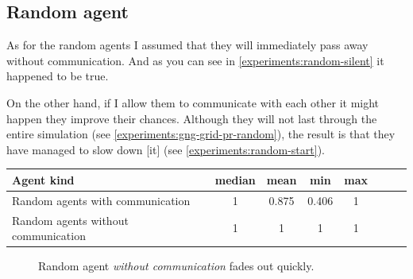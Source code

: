\clearpage

\subsection{Random agent}   

As for the random agents I assumed that they will immediately pass away without communication. And as you can see in \ref{experiments:random-silent} it happened to be true. 

On the other hand, if I allow them to communicate with each other it might happen they improve their chances. Although they will not last through the entire simulation (see \ref{experiments:gng-grid-pr-random}), the result is that they have managed to slow down [it] (see \ref{experiments:random-start}).

\begin{center}   
  \begin{tabular}{l*{6}{c}r}
  Agent kind        & median & mean & min & max \\
  \hline  
  Random agents with communication     & 1 & 0.875 & 0.406 & 1  \\
  Random agents without communication    & 1 & 1 & 1 & 1  \\
  \end{tabular}                  
\end{center}


\begin{figure}[h!]
  \centering      
  \caption{Random agent \emph{without communication} fades out quickly.}
\end{figure} 


